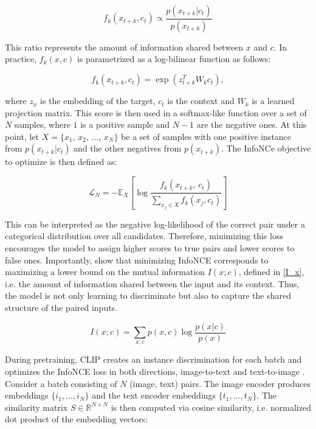 \documentclass[a4paper, twoside, english]{sapthesis} %
\begin{document}
\begin{equation}\label{f_x}
    f_k(x_{t+k}, c_t) \propto \frac{p(x_{t+k}|c_t)}{p(x_{t+k})}
\end{equation}

This ratio represents the amount of information shared between $x$ and $c$. In practice, $f_k(x, c)$ is parametrized as a log-bilinear function as follows:

\begin{equation}\label{exp}
    f_k(x_{t+k}, c_t) = \exp \left( z^T_{t+k} W_k c_t \right),
\end{equation}

where $z_x$ is the embedding of the target, $c_t$ is the context and $W_k$ is a learned projection matrix. This score is then used in a softmax-like function over a set of $N$ samples, where $1$ is a positive sample and $N - 1$ are the negative ones. At this point, let $X = \{x_1, \, x_2, \, \ldots, \, x_N\}$ be a set of samples with one positive instance from $p(x_{t+k} | c_t)$  and the other negatives from $p(x_{t+k})$. The InfoNCe objective to optimize is then defined as:

\begin{equation}\label{InfoNCE}
    \mathcal{L}_N = -\mathbb{E}_X \left[ \log \frac{f_k(x_{t+k}, \, c_t)}{\sum_{x_j \in X} f_k(x_j, c_t)} \right]
\end{equation}

This can be interpreted as the negative log-likelihood of the correct pair under a categorical distribution over all candidates. Therefore, minimizing this loss encourages the model to assign higher scores to true pairs and lower scores to false ones. Importantly, \cite{oord2018representation} show that minimizing InfoNCE corresponds to maximizing a lower bound on the mutual information $I(x;c)$, defined in \ref{I_x}, i.e. the amount of information shared between the input and its context. Thus, the model is not only learning to discriminate but also to capture the shared structure of the paired inputs.

\begin{equation}\label{I_x}
    I(x;c) = \sum_{x, c} p(x, c) \log \frac{p(x|c)}{p(x)}
\end{equation}

During pretraining, CLIP creates an instance discrimination for each batch and optimizes the InfoNCE loss in both directions, image-to-text and text-to-image \cite{radford2021learning} \cite{liu2024remoteclip}. Consider a batch consisting of $N$ (image, text) pairs. The image encoder produces embeddings $\{i_1, \ldots, i_N\}$ and the text encoder embeddings $\{t_1, \ldots, t_N\}$. The similarity matrix $S \in \mathbb{R}^{N \times N}$ is then computed via cosine similarity, i.e. normalized dot product of the embedding vectors:
\end{document}
